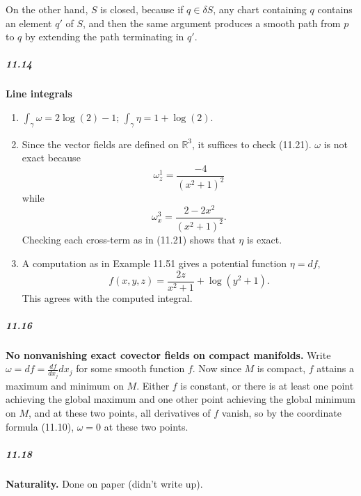 \documentclass[10pt,letter]{article}
\begin{document}
On the other hand, $S$ is closed, because if $q \in \delta S$, any chart containing $q$ contains an element $q'$ of $S$, and then the same argument produces a smooth path from $p$ to $q$ by extending the path terminating in $q'$.

\subparagraph*{11.14} {\bf Line integrals} 
\begin{enumerate}
\item $\int_{\gamma} \omega = 2 \log(2) - 1$; $\int_{\gamma} \eta = 1+ \log(2)$. 
\item Since the vector fields are defined on $\mathbb{R}^3$, it suffices to check (11.21). $\omega$ is not exact because \[ \omega^1_z = \frac{-4}{(x^2+1)^2} \] while \[ \omega^3_x = \frac{2 -2x^2}{(x^2+1)^2}. \] Checking each cross-term as in (11.21) shows that $\eta$ is exact.
\item A computation as in Example 11.51 gives a potential function $\eta = df$, \[ f(x,y,z) = \frac{2z}{x^2+1} + \log(y^2+1). \] This agrees with the computed integral. 
\end{enumerate}

\subparagraph*{11.16} {\bf No nonvanishing exact covector fields on compact manifolds.} 
Write $\omega = df = \frac{df}{dx_j} dx_j$ for some smooth function $f$. Now since $M$ is compact, $f$ attains a maximum and minimum on $M$. Either $f$ is constant, or there is at least one point achieving the global maximum and one other point achieving the global minimum on $M$, and at these two points, all derivatives of $f$ vanish, so by the coordinate formula (11.10), $\omega = 0$ at these two points. 

\subparagraph*{11.18} {\bf Naturality.} Done on paper (didn't write up). 
\end{document}

